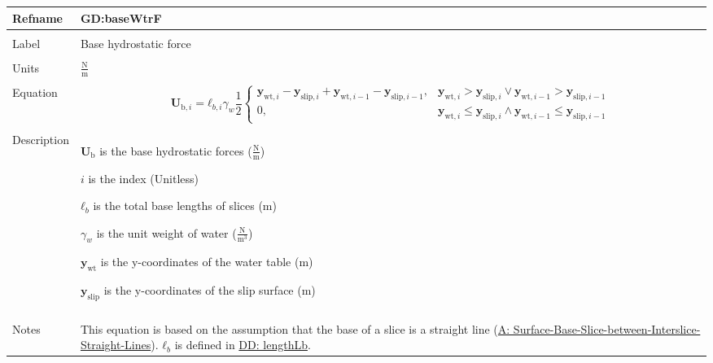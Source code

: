 \documentclass[12pt]{article}
\begin{document}
\vspace{\baselineskip}
\noindent
\begin{minipage}{\textwidth}
\begin{tabular}{>{\raggedright}p{}>{\raggedright\arraybackslash}p{}}
\toprule \textbf{Refname} & \textbf{GD:baseWtrF}
\label{GD:baseWtrF}
\\ \midrule \\
Label & Base hydrostatic force
        
\\ \midrule \\
Units & $\frac{\text{N}}{\text{m}}$
        
\\ \midrule \\
Equation & \begin{displaymath}
           {\mathbf{U}_{\text{b},i}}={\mathbf{ℓ}_{b,i}} {γ_{w}} \frac{1}{2} \begin{cases}
                                                                            {\mathbf{y}_{\text{wt},i}}-{\mathbf{y}_{\text{slip},i}}+{\mathbf{y}_{\text{wt},i-1}}-{\mathbf{y}_{\text{slip},i-1}}, & {\mathbf{y}_{\text{wt},i}}>{\mathbf{y}_{\text{slip},i}}\lor{}{\mathbf{y}_{\text{wt},i-1}}>{\mathbf{y}_{\text{slip},i-1}}\\
                                                                            0, & {\mathbf{y}_{\text{wt},i}}\leq{}{\mathbf{y}_{\text{slip},i}}\land{}{\mathbf{y}_{\text{wt},i-1}}\leq{}{\mathbf{y}_{\text{slip},i-1}}
                                                                            \end{cases}
           \end{displaymath}
\\ \midrule \\
Description & \begin{symbDescription}
              \item{${\mathbf{U}_{\text{b}}}$ is the base hydrostatic forces ($\frac{\text{N}}{\text{m}}$)}
              \item{$i$ is the index (Unitless)}
              \item{${\mathbf{ℓ}_{b}}$ is the total base lengths of slices (m)}
              \item{${γ_{w}}$ is the unit weight of water ($\frac{\text{N}}{\text{m}^{3}}$)}
              \item{${\mathbf{y}_{\text{wt}}}$ is the y-coordinates of the water table (m)}
              \item{${\mathbf{y}_{\text{slip}}}$ is the y-coordinates of the slip surface (m)}
              \end{symbDescription}
\\ \midrule \\
Notes & This equation is based on the assumption that the base of a slice is a straight line (\hyperref[assumpSBSBISL]{A: Surface-Base-Slice-between-Interslice-Straight-Lines}). ${\mathbf{ℓ}_{b}}$ is defined in \hyperref[DD:lengthLb]{DD: lengthLb}.
        

\end{tabular}
\end{minipage}
\end{document}
